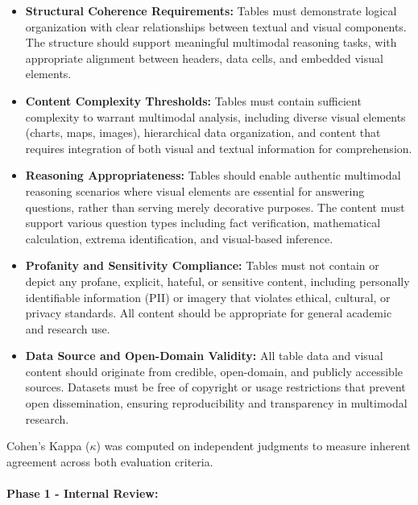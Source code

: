 \documentclass[11pt]{article}
\begin{document}
\begin{itemize}[leftmargin=*,itemsep=0.1em]
    \item \textbf{Structural Coherence Requirements:} Tables must demonstrate logical organization with clear relationships between textual and visual components. The structure should support meaningful multimodal reasoning tasks, with appropriate alignment between headers, data cells, and embedded visual elements.

\item \textbf{Content Complexity Thresholds:} Tables must contain sufficient complexity to warrant multimodal analysis, including diverse visual elements (charts, maps, images), hierarchical data organization, and content that requires integration of both visual and textual information for comprehension.

\item \textbf{Reasoning Appropriateness:} Tables should enable authentic multimodal reasoning scenarios where visual elements are essential for answering questions, rather than serving merely decorative purposes. The content must support various question types including fact verification, mathematical calculation, extrema identification, and visual-based inference.

\item \textbf{Profanity and Sensitivity Compliance:} Tables must not contain or depict any profane, explicit, hateful, or sensitive content, including personally identifiable information (PII) or imagery that violates ethical, cultural, or privacy standards. All content should be appropriate for general academic and research use.

\item \textbf{Data Source and Open-Domain Validity:} All table data and visual content should originate from credible, open-domain, and publicly accessible sources. Datasets must be free of copyright or usage restrictions that prevent open dissemination, ensuring reproducibility and transparency in multimodal research.

    
\end{itemize}

Cohen's Kappa ($\kappa$) was computed on independent judgments to measure inherent agreement across both evaluation criteria.

\paragraph{Phase 1 - Internal Review:} 
\end{document}

